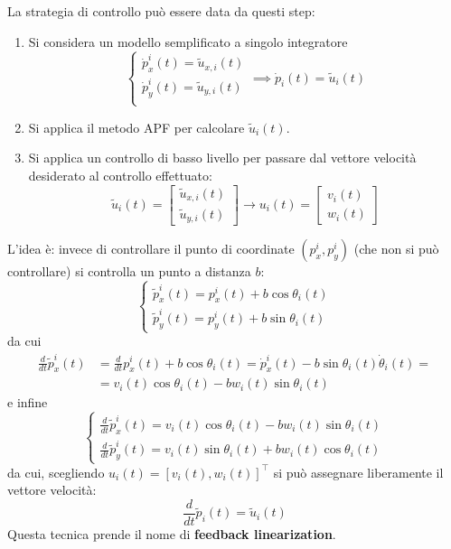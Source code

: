 La strategia di controllo pu\`o essere data da questi step:
\begin{enumerate}
\item Si considera un modello semplificato a singolo integratore
    \begin{equation}
    \begin{cases}
    \dot{p}_x^i(t) = \tilde{u}_{x,i}(t) \\
    \dot{p}_y^i(t) = \tilde{u}_{y,i}(t) \\
    \end{cases} \implies \dot{p}_i(t) = \tilde{u}_i(t)
    \end{equation}
\item Si applica il metodo APF per calcolare $\tilde{u}_i(t)$.
\item Si applica un controllo di basso livello per passare dal vettore velocit\`a desiderato al controllo effettuato:
   \begin{equation}
    \tilde{u}_i(t) = \begin{bmatrix}
    \tilde{u}_{x,i}(t) \\
    \tilde{u}_{y,i}(t)
    \end{bmatrix} \to u_i(t) = \begin{bmatrix}
    v_i(t)\\
    w_i(t)
    \end{bmatrix}
   \end{equation}
\end{enumerate}
L'idea \`e: invece di controllare il punto di coordinate $(p_x^i, p_y^i)$ (che non si pu\`o controllare) si controlla un punto a distanza $b$:
\begin{equation}
\begin{cases}
\tilde{p}_x^i(t) = p_x^i(t) + b\cos \theta_i(t) \\
\tilde{p}_y^i(t) = p_y^i(t) + b\sin \theta_i(t)
\end{cases}
\end{equation} da cui
\begin{align*}
\frac{d}{dt} \tilde{p}_x^i(t) &= \frac{d}{dt} p_x^i(t) + b \cos \theta_i(t) = \dot{p}_x^i(t) - b \sin \theta_i(t) \dot{\theta}_i(t) = \\
&= v_i(t) \cos \theta_i(t) - b w_i(t) \sin \theta_i(t)
\end{align*} e infine
\begin{equation}
\begin{cases}
\frac{d}{dt} \tilde{p}_x^i(t) = v_i(t) \cos \theta_i(t) - b w_i(t) \sin \theta_i(t) \\
\frac{d}{dt} \tilde{p}_y^i(t) = v_i(t) \sin \theta_i(t) + b w_i(t) \cos \theta_i(t)
\end{cases}
\end{equation} da cui, scegliendo $u_i(t) = [v_i(t), w_i(t)]^\intercal $ si pu\`o assegnare liberamente il vettore velocit\`a:
\begin{equation}
\frac{d}{dt} \tilde{p}_i(t) = \tilde{u}_i(t)
\end{equation}
Questa tecnica prende il nome di \textbf{feedback linearization}.

